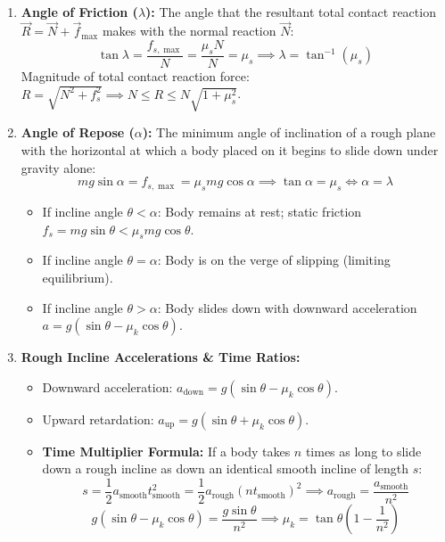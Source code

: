 \documentclass[11pt,a4paper]{article}
\begin{document}
\vspace{5pt}
\noindent{\large\textbf{\textsf{\textcolor{primaryDark}{2.2 Characteristic Angles and Inclined Plane Dynamics}}}}\\[3pt]
\begin{enumerate}[label=(\alph*),leftmargin=14pt,itemsep=2.5pt]
  \item \textbf{Angle of Friction ($\lambda$):} The angle that the resultant total contact reaction $\vec{R} = \vec{N} + \vec{f}_{\max}$ makes with the normal reaction $\vec{N}$:
  \[
    \tan\lambda = \frac{f_{s,\max}}{N} = \frac{\mu_s N}{N} = \mu_s \implies \lambda = \tan^{-1}(\mu_s)
  \]
  Magnitude of total contact reaction force: $R = \sqrt{N^2 + f_s^2} \implies N \le R \le N\sqrt{1 + \mu_s^2}$.
  \item \textbf{Angle of Repose ($\alpha$):} The minimum angle of inclination of a rough plane with the horizontal at which a body placed on it begins to slide down under gravity alone:
  \[
    mg\sin\alpha = f_{s,\max} = \mu_s mg\cos\alpha \implies \tan\alpha = \mu_s \iff \alpha = \lambda
  \]
  \begin{itemize}[leftmargin=12pt,itemsep=1pt]
    \item If incline angle $\theta < \alpha$: Body remains at rest; static friction $f_s = mg\sin\theta < \mu_s mg\cos\theta$.
    \item If incline angle $\theta = \alpha$: Body is on the verge of slipping (limiting equilibrium).
    \item If incline angle $\theta > \alpha$: Body slides down with downward acceleration $a = g(\sin\theta - \mu_k\cos\theta)$.
  \end{itemize}
  \item \textbf{Rough Incline Accelerations \& Time Ratios:}
  \begin{itemize}[leftmargin=12pt,itemsep=1.5pt]
    \item Downward acceleration: $a_{\text{down}} = g(\sin\theta - \mu_k\cos\theta)$.
    \item Upward retardation: $a_{\text{up}} = g(\sin\theta + \mu_k\cos\theta)$.
    \item \textbf{Time Multiplier Formula:} If a body takes $n$ times as long to slide down a rough incline as down an identical smooth incline of length $s$:
    \[
      s = \frac{1}{2}a_{\text{smooth}} t_{\text{smooth}}^2 = \frac{1}{2}a_{\text{rough}} (n t_{\text{smooth}})^2 \implies a_{\text{rough}} = \frac{a_{\text{smooth}}}{n^2}
    \]
    \[
      g(\sin\theta - \mu_k\cos\theta) = \frac{g\sin\theta}{n^2} \implies \mu_k = \tan\theta\left(1 - \frac{1}{n^2}\right)
\]
\end{itemize}
\end{enumerate}
\end{document}
